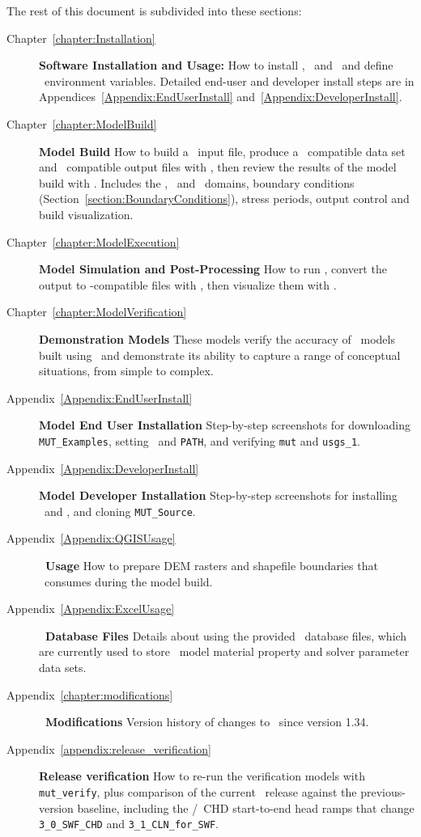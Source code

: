 The rest of this document is subdivided into these sections:
\begin{description}
    \item[Chapter~\ref{chapter:Installation}]\textbf{Software Installation and Usage:} How to install \mut, \mfus\ and \tecplot\ and define \windows\ environment variables. Detailed end-user and developer install steps are in Appendices~\ref{Appendix:EndUserInstall} and~\ref{Appendix:DeveloperInstall}.
     \item[Chapter~\ref{chapter:ModelBuild}]\textbf{Model Build} How to build a \mut\ input file, produce a \mfus\ compatible data set and \tecplot\ compatible output files with \mut, then review the results of the model build with \tecplot. Includes the \gwf, \swf\ and \cln\ domains, boundary conditions (Section~\ref{section:BoundaryConditions}), stress periods, output control and build visualization.
    \item[Chapter~\ref{chapter:ModelExecution}]\textbf{Model Simulation and Post-Processing} How to run \mfus, convert the output to \tecplot-compatible files with \mut, then visualize them with \tecplot.
    \item[Chapter~\ref{chapter:ModelVerification}]\textbf{Demonstration Models} These models verify the accuracy of \mfus\ models built using \mut\ and demonstrate its ability to capture a range of conceptual situations, from simple to complex.
    \item[Appendix~\ref{Appendix:EndUserInstall}]\textbf{Model End User Installation} Step-by-step screenshots for downloading \texttt{MUT\_Examples}, setting \bin\ and \texttt{PATH}, and verifying \texttt{mut} and \texttt{usgs\_1}.
    \item[Appendix~\ref{Appendix:DeveloperInstall}]\textbf{Model Developer Installation} Step-by-step screenshots for installing \vstudio\ and \ifort, and cloning \texttt{MUT\_Source}.
    \item[Appendix~\ref{Appendix:QGISUsage}]\textbf{\qgis\ Usage} How to prepare DEM rasters and shapefile boundaries that \mut\ consumes during the model build.
    \item[Appendix~\ref{Appendix:ExcelUsage}]\textbf{\excel\ Database Files} Details about using the provided \excel\ database files, which are currently used to store \mfus\ model material property and solver parameter data sets.
    \item[Appendix~\ref{chapter:modifications}]\textbf{\mut\ Modifications} Version history of changes to \mut\ since version 1.34.
    \item[Appendix~\ref{appendix:release_verification}]\textbf{Release verification} How to re-run the verification models with \texttt{mut\_verify}, plus comparison of the current \mut\ release against the previous-version baseline, including the \cln/\swf\ CHD start-to-end head ramps that change \texttt{3\_0\_SWF\_CHD} and \texttt{3\_1\_CLN\_for\_SWF}.
        \end{description}

